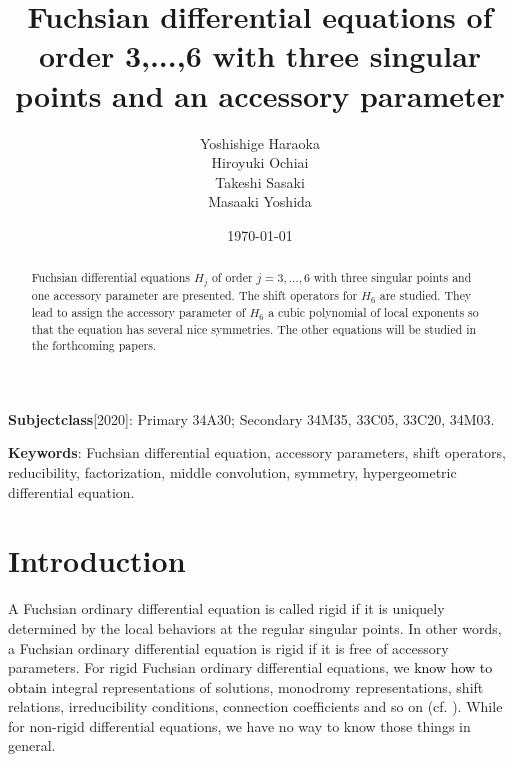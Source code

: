 \documentclass[a4paper,12pt]{article}
\author{\large %
Yoshishige Haraoka \\
Hiroyuki Ochiai\\
Takeshi Sasaki\\
Masaaki Yoshida}
\title{\bf  Fuchsian differential equations of order 3,...,6 with three singular points and an accessory parameter}
\date{\today}
\theoremstyle{definition}
\theoremstyle{remark}
\numberwithin{equation}{section} %
\newcommand{\blue}[1]{\textcolor{black}{#1}}
\begin{document}
\maketitle
\dosecttoc

\begin{abstract}
  Fuchsian differential equations $H_j$ of order $j=3,\dots,6$ with three singular points and one accessory parameter are presented. The shift operators for $H_6$ are studied. They lead to assign the accessory parameter of $H_6$ a cubic polynomial of local exponents so that the equation has several nice symmetries. The other equations will be studied in the forthcoming papers.
\end{abstract}
\tableofcontents
\vfill

\noindent
{\bf Subjectclass}[2020]: Primary 34A30; Secondary 34M35, 33C05, 33C20, 34M03.

\noindent
    {\bf Keywords}: Fuchsian differential equation, accessory parameters, shift operators,    reducibility,  factorization, middle convolution, 
  symmetry, hypergeometric differential equation.%


\newpage
\section*{Introduction}\setcounter{stc}{1}%
{} 
A Fuchsian ordinary differential equation is called rigid
if it is uniquely determined
by the local behaviors at the regular singular points.
In other words, a Fuchsian ordinary differential equation is rigid
if it is free of accessory parameters.
For rigid Fuchsian ordinary differential equations,
we \blue{know how to obtain} integral representations of solutions,
monodromy representations, shift relations, irreducibility conditions,
connection coefficients and so on (cf. \cite{Osh,Hara}).
While for non-rigid differential equations,
we have no way to know those things in general.
\par\medskip
\end{document}
